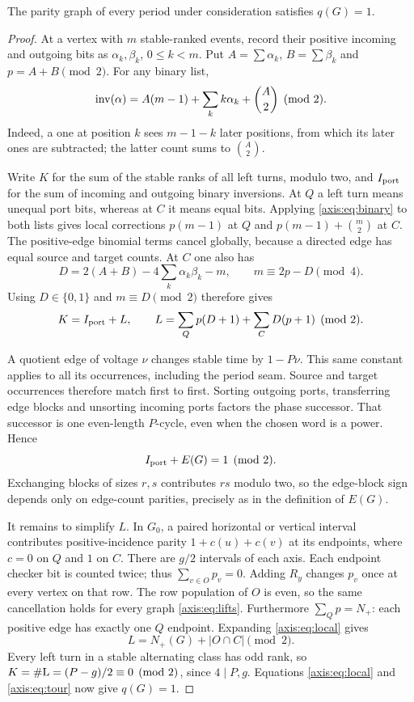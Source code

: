 \begin{lemma}\label{axis:lem:actual}
The parity graph of every period under consideration satisfies $q(G)=1$.
\end{lemma}
\begin{proof}
At a vertex with $m$ stable-ranked events, record their positive incoming and
outgoing bits as $\alpha_k,\beta_k$, $0\le k<m$. Put
$A=\sum\alpha_k$, $B=\sum\beta_k$ and $p=A+B\pmod2$. For any binary list,
\begin{equation}\label{axis:eq:binary}
 \operatorname{inv}(\alpha)=A(m-1)+\sum_k k\alpha_k+\binom A2\pmod2.
\end{equation}
Indeed, a one at position $k$ sees $m-1-k$ later positions, from which its
later ones are subtracted; the latter count sums to $\binom A2$.

Write $K$ for the sum of the stable ranks of all left turns, modulo two, and
$I_{\rm port}$ for the sum of incoming and outgoing binary inversions.
At $Q$ a left turn means unequal port bits, whereas at $C$ it means equal
bits. Applying \eqref{axis:eq:binary} to both lists gives local corrections
$p(m-1)$ at $Q$ and $p(m-1)+\binom m2$ at $C$. The positive-edge binomial terms
cancel globally, because a directed edge has equal source and target counts.
At $C$ one also has
\[
 D=2(A+B)-4\sum_k\alpha_k\beta_k-m,\qquad m\equiv2p-D\pmod4.
\]
Using $D\in\{0,1\}$ and $m\equiv D\pmod2$ therefore gives
\begin{equation}\label{axis:eq:local}
 K=I_{\rm port}+L,\qquad
 L=\sum_Qp(D+1)+\sum_CD(p+1)\pmod2.
\end{equation}

A quotient edge of voltage $\nu$ changes stable time by $1-P\nu$. This same
constant applies to all its occurrences, including the period seam. Source
and target occurrences therefore match first to first. Sorting outgoing
ports, transferring edge blocks and unsorting incoming ports factors the
phase successor. That successor is one even-length $P$-cycle, even when the
chosen word is a power. Hence
\begin{equation}\label{axis:eq:tour}
 I_{\rm port}+E(G)=1\pmod2.
\end{equation}
Exchanging blocks of sizes $r,s$ contributes $rs$ modulo two, so the edge-block
sign depends only on edge-count parities, precisely as in the definition of
$E(G)$.

It remains to simplify $L$. In $G_0$, a paired horizontal or vertical interval
contributes positive-incidence parity $1+c(u)+c(v)$ at its endpoints, where
$c=0$ on $Q$ and $1$ on $C$. There are $g/2$ intervals of each axis. Each
endpoint checker bit is counted twice; thus $\sum_{v\in O}p_v=0$.
Adding $R_y$ changes $p_v$ once at every vertex on that row. The row population
of $O$ is even, so the same cancellation holds for every graph \eqref{axis:eq:lifts}.
Furthermore $\sum_Qp=N_+$: each positive edge has exactly one $Q$ endpoint.
Expanding \eqref{axis:eq:local} gives
\[
 L=N_+(G)+|O\cap C|\pmod2.
\]
Every left turn in a stable alternating class has odd rank, so
$K=\#\mathrm L=(P-g)/2\equiv0\pmod2$, since $4\mid P,g$.
Equations \eqref{axis:eq:local} and \eqref{axis:eq:tour} now give $q(G)=1$.
\end{proof}

